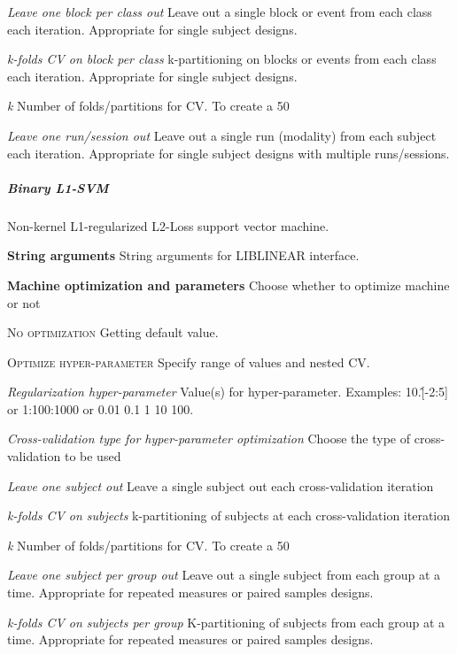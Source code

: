 \textit{Leave one block per class out}
Leave out a single block or event from each class each iteration. Appropriate for single subject designs.


\textit{k-folds CV on block per class}
k-partitioning on blocks or events from each class each iteration. Appropriate for single subject designs.


\textit{k}
Number of folds/partitions for CV. To create a 50%


\textit{Leave one run/session out}
Leave out a single run (modality) from each subject each iteration. Appropriate for single subject designs with multiple runs/sessions.


\subparagraph{Binary L1-SVM}
Non-kernel L1-regularized L2-Loss support vector machine.


\textbf{String arguments}
String arguments for LIBLINEAR interface.


\textbf{Machine optimization and parameters}
Choose whether to optimize machine or not


\textsc{No optimization}
Getting default value.


\textsc{Optimize hyper-parameter}
Specify range of values and nested CV.


\textsl{Regularization hyper-parameter}
Value(s) for hyper-parameter. Examples: 10.\^[-2:5] or 1:100:1000 or 0.01 0.1 1 10 100.


\textsl{Cross-validation type for hyper-parameter optimization}
Choose the type of cross-validation to be used


\textit{Leave one subject out}
Leave a single subject out each cross-validation iteration


\textit{k-folds CV on subjects}
k-partitioning of subjects at each cross-validation iteration


\textit{k}
Number of folds/partitions for CV. To create a 50%


\textit{Leave one subject per group out}
Leave out a single subject from each group at a time. Appropriate for repeated measures or paired samples designs.


\textit{k-folds CV on subjects per group}
K-partitioning of subjects from each group at a time. Appropriate for repeated measures or paired samples designs.


